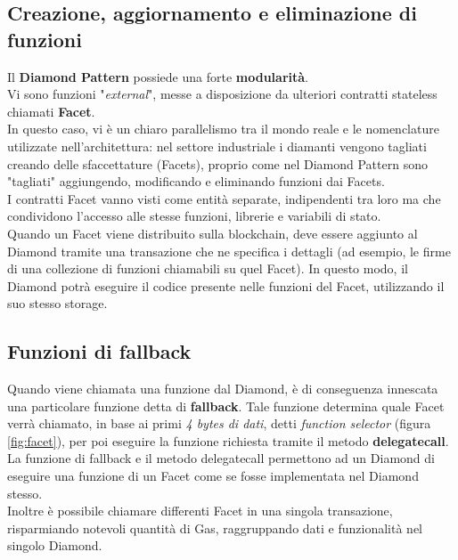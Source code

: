 \documentclass[12pt,a4paper]{report}
\begin{document}
\subsection{Creazione, aggiornamento e eliminazione di funzioni}

Il \textbf{Diamond Pattern} possiede una forte \textbf{modularità}. \\Vi sono funzioni "\textit{external}", messe a disposizione da ulteriori contratti stateless chiamati \textbf{Facet}.
\\In questo caso, vi è un chiaro parallelismo tra il mondo reale e le nomenclature utilizzate nell'architettura: nel settore industriale i diamanti vengono tagliati creando delle sfaccettature (Facets), proprio come nel Diamond Pattern sono "tagliati" aggiungendo, modificando e eliminando funzioni dai Facets. \\I contratti Facet vanno visti come entità separate, indipendenti tra loro ma che condividono l'accesso alle stesse funzioni, librerie e variabili di stato.
\\Quando un Facet viene distribuito sulla blockchain, deve essere aggiunto al Diamond tramite una transazione che ne specifica i dettagli (ad esempio, le firme di una collezione di funzioni chiamabili su quel Facet). In questo modo, il Diamond potrà eseguire il codice presente nelle funzioni del Facet, utilizzando il suo stesso storage.



\subsection{Funzioni di fallback}

Quando viene chiamata una funzione dal Diamond, è di conseguenza innescata una particolare funzione detta di \textbf{fallback}. Tale funzione determina quale Facet verrà chiamato, in base ai primi \textit{4 bytes di dati}, detti \textit{function selector} (figura \ref{fig:facet}), per poi eseguire la funzione richiesta tramite il metodo \textbf{delegatecall}.
\\La funzione di fallback e il metodo delegatecall permettono ad un Diamond di eseguire una funzione di un Facet come se fosse implementata nel Diamond stesso. 
\\Inoltre è possibile chiamare differenti Facet in una singola transazione, risparmiando notevoli quantità di Gas, raggruppando dati e funzionalità nel singolo Diamond.
\end{document}
